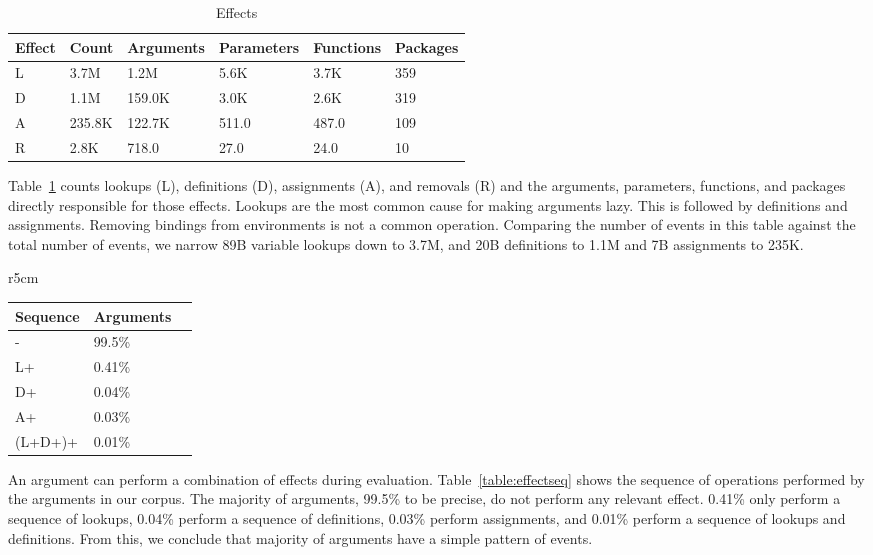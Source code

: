 \documentclass[review,nonacm,screen,acmsmall,anonymous=true]{acmart}
\begin{document}
\begin{table}[!h]  \vspace{-3mm}  \small
  \caption{Effects} \label{table:effects} \centering
  \begin{tabular}{llllll}    \toprule
    \textbf{Effect}&\textbf{Count}&\textbf{Arguments}&\textbf{Parameters}&\textbf{Functions}&\textbf{Packages}\\    \midrule
    L&3.7M&1.2M&5.6K&3.7K&359\\
    D&1.1M&159.0K&3.0K&2.6K&319\\
    A&235.8K&122.7K&511.0&487.0&109\\
    R&2.8K&718.0&27.0&24.0&10\\    \bottomrule
  \end{tabular}
\end{table}

\noindent
Table~\ref{table:effects} counts lookups (L), definitions (D), assignments (A),
and removals (R) and the arguments, parameters, functions, and packages directly
responsible for those effects. Lookups are the most common cause for making
arguments lazy. This is followed by definitions and assignments. Removing
bindings from environments is not a common operation.
%
Comparing the number of events in this table against the total number of events,
we narrow 89B variable lookups down to 3.7M, and 20B definitions to 1.1M and 7B
assignments to 235K.

\begin{wraptable}{r}{5cm}
  \vspace{-3mm}
  \small
  \caption{Effect Sequence} \label{table:effectseq}
  \centering
  \begin{tabular}{lll}
    \toprule
    \textbf{Sequence}&\textbf{Arguments}\\
    \midrule
    -&99.5\%\\
    L+&0.41\%\\
    D+&0.04\%\\
    A+&0.03\%\\
    (L+D+)+&0.01\%\\
    \bottomrule
  \end{tabular}
\end{wraptable}

An argument can perform a combination of effects during evaluation.
Table~\ref{table:effectseq} shows the sequence of operations performed by the
arguments in our corpus. The majority of arguments, 99.5\% to be precise, do not
perform any relevant effect. 0.41\% only perform a sequence of lookups, 0.04\%
perform a sequence of definitions, 0.03\% perform assignments, and 0.01\%
perform a sequence of lookups and definitions. From this, we conclude that
majority of arguments have a simple pattern of events.
\end{document}
